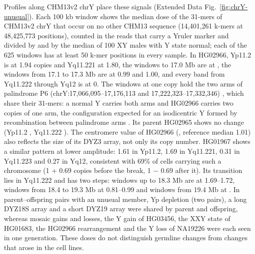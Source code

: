 Profiles along CHM13v2 chrY place these signals (Extended Data Fig.~\ref{fig:chrY-unusual}). Each 100 kb window shows the median dose of the 31-mers of CHM13v2 chrY that occur on no other CHM13 sequence (14,401,261 k-mers at 48,425,773 positions), counted in the reads that carry a Yruler marker and divided by  and by the median of 100 XY males with Y state normal; each of the 625 windows has at least 50 k-mer positions in every sample. In HG02966, Yp11.2 is at 1.94 copies and Yq11.221 at 1.80, the windows  to 17.0 Mb are at , the windows from 17.1 to 17.3 Mb are at 0.99 and 1.00, and every band from Yq11.222 through Yq12 is at 0. The windows at one copy hold the two arms of palindrome P6 (chrY:17,066,095--17,176,113 and 17,222,323--17,332,346) \cite{Rhie2023}, which share their 31-mers: a normal Y carries both arms and HG02966 carries two copies of one arm, the configuration expected for an isodicentric Y formed by recombination between palindrome arms \cite{Lange2009}. Its parent HG02965 shows no change (Yp11.2 , Yq11.222 ). The centromere value of HG02966 (, reference median 1.01) also reflects the size of its DYZ3 array, not only its copy number. HG01967 shows a similar pattern at lower amplitude: 1.61 in Yp11.2, 1.69 in Yq11.221, 0.31 in Yq11.223 and 0.27 in Yq12, consistent with 69\% of cells carrying such a chromosome (1 + 0.69 copies before the break, 1 $-$ 0.69 after it). Its transition lies in Yq11.222 and has two steps: windows up to 18.3 Mb are at 1.69--1.72, windows from 18.4 to 19.3 Mb at 0.81--0.99 and windows from 19.4 Mb at .  In  parent--offspring pairs with an unusual member, Yp depletion (two pairs), a long DYZ18S array and a short DYZ19 array were shared by parent and offspring, whereas mosaic gains and losses, the Y gain of HG03456, the XXY state of HG01683, the HG02966 rearrangement and the Y loss of NA19226 were each seen in one generation. These doses do not distinguish germline changes from changes that arose in the cell lines.

